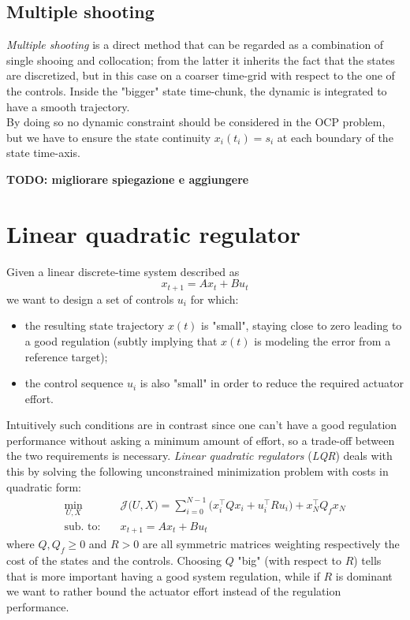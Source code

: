 \subsection{Multiple shooting}
	\textit{Multiple shooting} is a direct method that can be regarded as a combination of single shooing and collocation; from the latter it inherits the fact that the states are discretized, but in this case on a coarser time-grid with respect to the one of the controls. Inside the "bigger" state time-chunk, the dynamic is integrated to have a smooth trajectory. \\
	By doing so no dynamic constraint should be considered in the OCP problem, but we have to ensure the state continuity $x_i(t_i) = s_i$ at each boundary of the state time-axis.
	
	\textbf{TODO: migliorare spiegazione e aggiungere}
	
	
\section{Linear quadratic regulator} \label{sec:lqr}
	Given a linear discrete-time system described as
	\begin{equation} \label{eq:lineardynamics}
		x_{t+1} = A x_t + B u_t
	\end{equation}
	we want to design a set of controls $u_i$ for which:
	\begin{itemize}
		\item the resulting state trajectory $x(t)$ is "small", staying close to zero leading to a good regulation (subtly implying that $x(t)$ is modeling the error from a reference target);
		\item the control sequence $u_i$ is also "small" in order to reduce the required actuator effort.
	\end{itemize}

	Intuitively such conditions are in contrast since one can't have a good regulation performance without asking a minimum amount of effort, so a trade-off between the two requirements is necessary. \textit{Linear quadratic regulators} (\textit{LQR}) deals with this by solving the following unconstrained minimization problem with costs in quadratic form:
	\begin{equation} \label{eq:LQRproblem}
	\begin{aligned}
		\min_{U,X} \quad & \mathcal J\big(U,X\big) = \sum_{i=0}^{N-1} \Big( x_i^\top  Q x_i + u_i^\top  R u_i \Big) + x_N^\top  Q_f x_N\\
		\textrm{sub. to:} \quad & x_{t+1} = A x_t + B u_t
	\end{aligned}
	\end{equation}
	where $Q,Q_f \geq 0$ and $R>0$ are all symmetric matrices weighting respectively the cost of the states and the controls. Choosing $Q$ "big" (with respect to $R$) tells that is more important having a good system regulation, while if $R$ is dominant we want to rather bound the actuator effort instead of the regulation performance.
	

